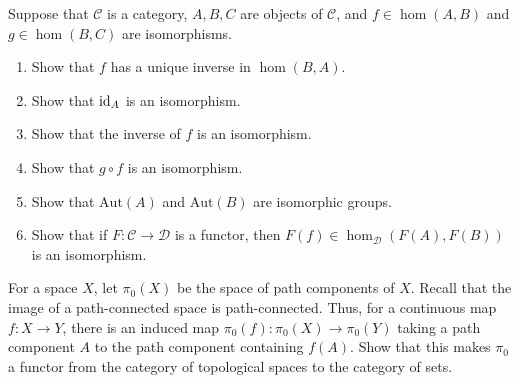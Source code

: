 \documentclass[12pt]{article}
\begin{document}
\begin{solu}

\end{solu}
\newpage


\begin{problab}{4}
Suppose that $\mathcal{C}$ is a category, $A, B, C$ are objects of $\mathcal{C}$, and $f \in \hom(A,B)$ and $g \in \hom(B,C)$ are isomorphisms. 
    \begin{enumerate}
        \item Show that $f$ has a unique inverse in $\hom(B,A)$. 
        \item Show that $\operatorname{id}_A$ is an isomorphism.
        \item Show that the inverse of $f$ is an isomorphism.
        \item Show that $g \circ f$ is an isomorphism.
        \item Show that $\text{Aut}(A)$ and $\text{Aut}(B)$ are isomorphic groups.
        \item Show that if $F: \mathcal{C} \to \mathcal{D}$ is a functor, then $F(f) \in \hom_\mathcal{D} (F(A), F(B))$ is an isomorphism.
    \end{enumerate}
\end{problab}

\begin{solu}

\end{solu}
\newpage

\begin{problab}{5}
For a space $X$, let $\pi_0(X)$ be the space of path components of $X$. Recall that the image of a path-connected space is path-connected. Thus, for a continuous map $f: X \to Y$, there is an induced map $\pi_0(f): \pi_0(X) \to \pi_0(Y)$ taking a path component $A$ to the path component containing $f(A)$. Show that this makes $\pi_0$ a functor from the category of topological spaces to the category of sets.
\end{problab}
\end{document}
